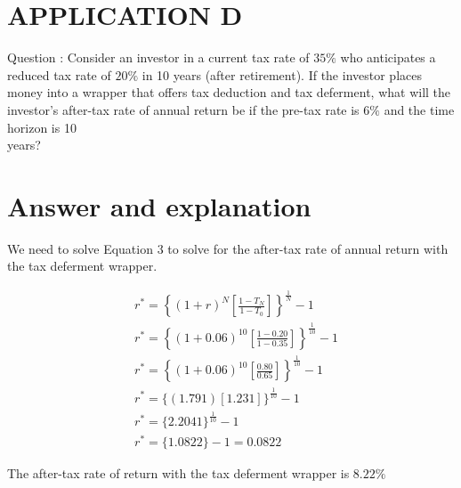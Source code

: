 \documentclass[11pt]{article}
\begin{document}
\section*{APPLICATION D}
Question : Consider an investor in a current tax rate of $35 \%$ who anticipates a reduced tax rate of $20 \%$ in 10 years (after retirement). If the investor places money into a wrapper that offers tax deduction and tax deferment, what will the investor's after-tax rate of annual return be if the pre-tax rate is $6 \%$ and the time horizon is 10\\
years?

\section*{Answer and explanation}
We need to solve Equation 3 to solve for the after-tax rate of annual return with the tax deferment wrapper.

$$
\begin{aligned}
& r^{*}=\left\{(1+r)^{N}\left[\frac{1-T_{N}}{1-T_{0}}\right]\right\}^{\frac{1}{N}}-1 \\
& r^{*}=\left\{(1+0.06)^{10}\left[\frac{1-0.20}{1-0.35}\right]\right\}^{\frac{1}{10}}-1 \\
& r^{*}=\left\{(1+0.06)^{10}\left[\frac{0.80}{0.65}\right]\right\}^{\frac{1}{10}}-1 \\
& r^{*}=\{(1.791)[1.231]\}^{\frac{1}{10}}-1 \\
& r^{*}=\{2.2041\}^{\frac{1}{10}}-1 \\
& r^{*}=\{1.0822\}-1=0.0822
\end{aligned}
$$

The after-tax rate of return with the tax deferment wrapper is $8.22 \%$
\end{document}

